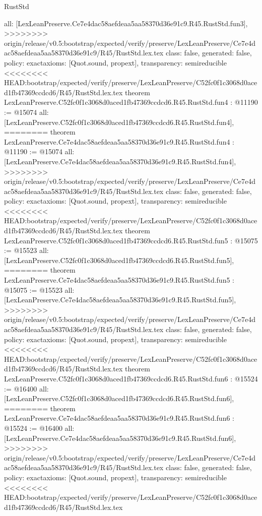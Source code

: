 \begin{lexlean}{RustStd}
\begin{coremodule}
{\begin{coremodule}
{{{{{{{  all: [LexLeanPreserve.Ce7e4dac58aefdeaa5aa58370d36e91c9.R45.RustStd.fun3],
>>>>>>>> origin/release/v0.5:bootstrap/expected/verify/preserve/LexLeanPreserve/Ce7e4dac58aefdeaa5aa58370d36e91c9/R45/RustStd.lex.tex
  class: false,
  generated: false,
  policy: exact{axioms: [Quot.sound, propext]},
  transparency: semireducible
}
<<<<<<<< HEAD:bootstrap/expected/verify/preserve/LexLeanPreserve/C52fc0f1c3068d0aced1fb47369ccdcd6/R45/RustStd.lex.tex
theorem LexLeanPreserve.C52fc0f1c3068d0aced1fb47369ccdcd6.R45.RustStd.fun4 : @11190 := @15074 {
  all: [LexLeanPreserve.C52fc0f1c3068d0aced1fb47369ccdcd6.R45.RustStd.fun4],
========
theorem LexLeanPreserve.Ce7e4dac58aefdeaa5aa58370d36e91c9.R45.RustStd.fun4 : @11190 := @15074 {
  all: [LexLeanPreserve.Ce7e4dac58aefdeaa5aa58370d36e91c9.R45.RustStd.fun4],
>>>>>>>> origin/release/v0.5:bootstrap/expected/verify/preserve/LexLeanPreserve/Ce7e4dac58aefdeaa5aa58370d36e91c9/R45/RustStd.lex.tex
  class: false,
  generated: false,
  policy: exact{axioms: [Quot.sound, propext]},
  transparency: semireducible
}
<<<<<<<< HEAD:bootstrap/expected/verify/preserve/LexLeanPreserve/C52fc0f1c3068d0aced1fb47369ccdcd6/R45/RustStd.lex.tex
theorem LexLeanPreserve.C52fc0f1c3068d0aced1fb47369ccdcd6.R45.RustStd.fun5 : @15075 := @15523 {
  all: [LexLeanPreserve.C52fc0f1c3068d0aced1fb47369ccdcd6.R45.RustStd.fun5],
========
theorem LexLeanPreserve.Ce7e4dac58aefdeaa5aa58370d36e91c9.R45.RustStd.fun5 : @15075 := @15523 {
  all: [LexLeanPreserve.Ce7e4dac58aefdeaa5aa58370d36e91c9.R45.RustStd.fun5],
>>>>>>>> origin/release/v0.5:bootstrap/expected/verify/preserve/LexLeanPreserve/Ce7e4dac58aefdeaa5aa58370d36e91c9/R45/RustStd.lex.tex
  class: false,
  generated: false,
  policy: exact{axioms: [Quot.sound, propext]},
  transparency: semireducible
}
<<<<<<<< HEAD:bootstrap/expected/verify/preserve/LexLeanPreserve/C52fc0f1c3068d0aced1fb47369ccdcd6/R45/RustStd.lex.tex
theorem LexLeanPreserve.C52fc0f1c3068d0aced1fb47369ccdcd6.R45.RustStd.fun6 : @15524 := @16400 {
  all: [LexLeanPreserve.C52fc0f1c3068d0aced1fb47369ccdcd6.R45.RustStd.fun6],
========
theorem LexLeanPreserve.Ce7e4dac58aefdeaa5aa58370d36e91c9.R45.RustStd.fun6 : @15524 := @16400 {
  all: [LexLeanPreserve.Ce7e4dac58aefdeaa5aa58370d36e91c9.R45.RustStd.fun6],
>>>>>>>> origin/release/v0.5:bootstrap/expected/verify/preserve/LexLeanPreserve/Ce7e4dac58aefdeaa5aa58370d36e91c9/R45/RustStd.lex.tex
  class: false,
  generated: false,
  policy: exact{axioms: [Quot.sound, propext]},
  transparency: semireducible
}
<<<<<<<< HEAD:bootstrap/expected/verify/preserve/LexLeanPreserve/C52fc0f1c3068d0aced1fb47369ccdcd6/R45/RustStd.lex.tex
}}}}}}}}}
\end{coremodule}}
\end{coremodule}
\end{lexlean}
